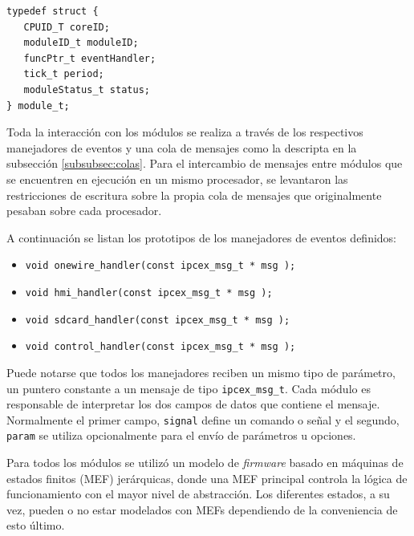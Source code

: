 \vspace{10px}

\begin{lstlisting}[caption={Definición de un nuevo tipo de dato module\_t.},label={lst:module_t}]
typedef struct {
   CPUID_T coreID;
   moduleID_t moduleID;
   funcPtr_t eventHandler;
   tick_t period;
   moduleStatus_t status;
} module_t;
\end{lstlisting}

\vspace{10px}

Toda la interacción con los módulos se realiza a través de los respectivos manejadores de eventos y una cola de mensajes como la descripta en la subsección \ref{subsubsec:colas}. Para el intercambio de mensajes entre módulos que se encuentren en ejecución en un mismo procesador, se levantaron las restricciones de escritura sobre la propia cola de mensajes que originalmente pesaban sobre cada procesador.

A continuación se listan los prototipos de los manejadores de eventos definidos:

\vspace{10px}

\begin{itemize}
  \item \texttt{void onewire\_handler(const ipcex\_msg\_t * msg );}
  \item \texttt{void hmi\_handler(const ipcex\_msg\_t * msg );}
  \item \texttt{void sdcard\_handler(const ipcex\_msg\_t * msg );}
  \item \texttt{void control\_handler(const ipcex\_msg\_t * msg );}
\end{itemize}

\vspace{10px}

Puede notarse que todos los manejadores reciben un mismo tipo de parámetro, un puntero constante a un mensaje de tipo \texttt{ipcex\_msg\_t}.  Cada módulo es responsable de interpretar los dos campos de datos que contiene el mensaje.  Normalmente el primer campo, \texttt{signal} define un comando o señal y el segundo, \texttt{param} se utiliza opcionalmente para el envío de parámetros u opciones.

Para todos los módulos se utilizó un modelo de \textit{firmware} basado en máquinas de estados finitos (MEF) jerárquicas, donde una MEF principal controla la lógica de funcionamiento con el mayor nivel de abstracción. Los diferentes estados, a su vez, pueden o no estar modelados con MEFs dependiendo de la conveniencia de esto último.

